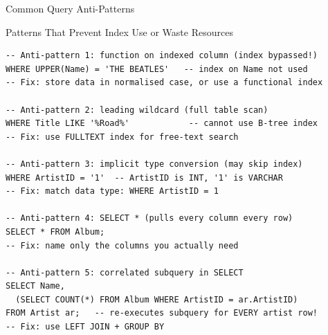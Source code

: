 \begin{frame}[fragile]{Common Query Anti-Patterns}
  \begin{block}{Patterns That Prevent Index Use or Waste Resources}
\begin{lstlisting}[style=sqlstyle]
-- Anti-pattern 1: function on indexed column (index bypassed!)
WHERE UPPER(Name) = 'THE BEATLES'   -- index on Name not used
-- Fix: store data in normalised case, or use a functional index

-- Anti-pattern 2: leading wildcard (full table scan)
WHERE Title LIKE '%Road%'            -- cannot use B-tree index
-- Fix: use FULLTEXT index for free-text search

-- Anti-pattern 3: implicit type conversion (may skip index)
WHERE ArtistID = '1'  -- ArtistID is INT, '1' is VARCHAR
-- Fix: match data type: WHERE ArtistID = 1

-- Anti-pattern 4: SELECT * (pulls every column every row)
SELECT * FROM Album;
-- Fix: name only the columns you actually need

-- Anti-pattern 5: correlated subquery in SELECT
SELECT Name,
  (SELECT COUNT(*) FROM Album WHERE ArtistID = ar.ArtistID)
FROM Artist ar;   -- re-executes subquery for EVERY artist row!
-- Fix: use LEFT JOIN + GROUP BY
\end{lstlisting}
  \end{block}
\end{frame}

